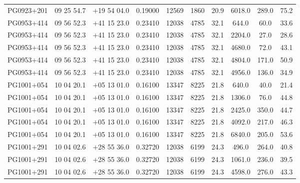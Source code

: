 \begin{landscape}
\begin{center}
\begin{longtable}{l c c c c c c c c c}
PG0923+201  &              09 25 54.7  &         $+$19 54 04.0  &       0.19000  & 12569  &   1860  &       20.9  &      6018.0  &  289.0  &  75.2  \\
PG0953+414  &              09 56 52.3  &         $+$41 15 23.0  &       0.23410  & 12038  &   4785  &       32.1  &      644.0  &   60.0  &   33.6  \\
PG0953+414  &              09 56 52.3  &         $+$41 15 23.0  &       0.23410  & 12038  &   4785  &       32.1  &      2204.0  &  27.0  &   28.6  \\
PG0953+414  &              09 56 52.3  &         $+$41 15 23.0  &       0.23410  & 12038  &   4785  &       32.1  &      4680.0  &  72.0  &   43.1  \\
PG0953+414  &              09 56 52.3  &         $+$41 15 23.0  &       0.23410  & 12038  &   4785  &       32.1  &      4804.0  &  171.0  &  50.9  \\
PG0953+414  &              09 56 52.3  &         $+$41 15 23.0  &       0.23410  & 12038  &   4785  &       32.1  &      4956.0  &  136.0  &  34.9  \\
PG1001+054  &              10 04 20.1  &         $+$05 13 01.0  &       0.16100  & 13347  &   8225  &       21.8  &      640.0  &   40.0  &   21.4  \\
PG1001+054  &              10 04 20.1  &         $+$05 13 01.0  &       0.16100  & 13347  &   8225  &       21.8  &      1306.0  &  76.0  &   44.8  \\
PG1001+054  &              10 04 20.1  &         $+$05 13 01.0  &       0.16100  & 13347  &   8225  &       21.8  &      2425.0  &  350.0  &  44.7  \\
PG1001+054  &              10 04 20.1  &         $+$05 13 01.0  &       0.16100  & 13347  &   8225  &       21.8  &      4092.0  &  217.0  &  46.3  \\
PG1001+054  &              10 04 20.1  &         $+$05 13 01.0  &       0.16100  & 13347  &   8225  &       21.8  &      6840.0  &  205.0  &  53.6  \\
PG1001+291  &              10 04 02.6  &         $+$28 55 36.0  &       0.32720  & 12038  &   6199  &       24.3  &      496.0  &   264.0  &  40.8  \\
PG1001+291  &              10 04 02.6  &         $+$28 55 36.0  &       0.32720  & 12038  &   6199  &       24.3  &      1061.0  &  236.0  &  39.5  \\
PG1001+291  &              10 04 02.6  &         $+$28 55 36.0  &       0.32720  & 12038  &   6199  &       24.3  &      4598.0  &  276.0  &  43.3  \\

\end{longtable}
\end{center}
\end{landscape}
